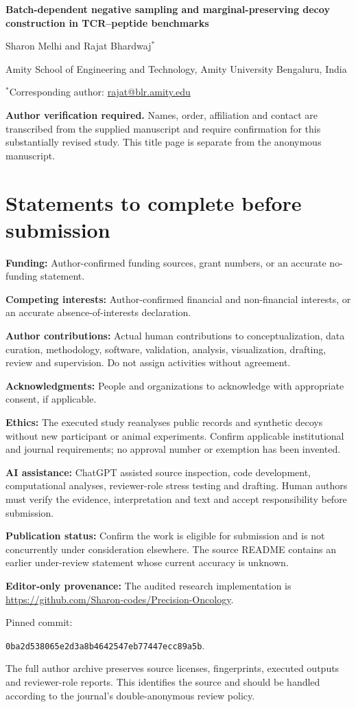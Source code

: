 \documentclass[11pt,a4paper]{article}
\begin{document}
\begin{center}
{\Large\bfseries Batch-dependent negative sampling and marginal-preserving decoy construction in TCR--peptide benchmarks}\par
\vspace{10pt}
Sharon Melhi and Rajat Bhardwaj$^*$\par
Amity School of Engineering and Technology, Amity University Bengaluru, India\par
$^*$Corresponding author: \href{mailto:rajat@blr.amity.edu}{rajat@blr.amity.edu}
\end{center}
\textbf{Author verification required.} Names, order, affiliation and contact are transcribed from the supplied manuscript and require confirmation for this substantially revised study. This title page is separate from the anonymous manuscript.

\section*{Statements to complete before submission}
\textbf{Funding:} Author-confirmed funding sources, grant numbers, or an accurate no-funding statement.

\textbf{Competing interests:} Author-confirmed financial and non-financial interests, or an accurate absence-of-interests declaration.

\textbf{Author contributions:} Actual human contributions to conceptualization, data curation, methodology, software, validation, analysis, visualization, drafting, review and supervision. Do not assign activities without agreement.

\textbf{Acknowledgments:} People and organizations to acknowledge with appropriate consent, if applicable.

\textbf{Ethics:} The executed study reanalyses public records and synthetic decoys without new participant or animal experiments. Confirm applicable institutional and journal requirements; no approval number or exemption has been invented.

\textbf{AI assistance:} ChatGPT assisted source inspection, code development, computational analyses, reviewer-role stress testing and drafting. Human authors must verify the evidence, interpretation and text and accept responsibility before submission.

\textbf{Publication status:} Confirm the work is eligible for submission and is not concurrently under consideration elsewhere. The source README contains an earlier under-review statement whose current accuracy is unknown.

\textbf{Editor-only provenance:} The audited research implementation is \url{https://github.com/Sharon-codes/Precision-Oncology}.\par Pinned commit:\par \texttt{0ba2d538065e2d3a8b4642547eb77447ecc89a5b}.\par The full author archive preserves source licenses, fingerprints, executed outputs and reviewer-role reports. This identifies the source and should be handled according to the journal's double-anonymous review policy.
\end{document}

